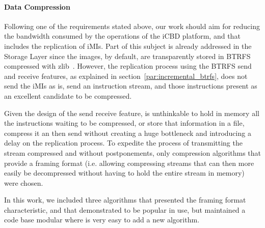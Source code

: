 \paragraph{Data Compression}
\label{par:rep_data_compression}

Following one of the requirements stated above, our work should aim for reducing the bandwidth consumed by the operations of the iCBD platform, and that includes the replication of iMIs. Part of this subject is already addressed in the Storage Layer since the images, by default, are transparently stored in BTRFS compressed with zlib~\cite{btrfs_compression}. However, the replication process using the BTRFS send and receive features, as explained in section~\ref{par:incremental_btrfs}, does not send the iMIs as is, send an instruction stream, and those instructions present as an excellent candidate to be compressed. 

Given the design of the send \/ receive feature, is unthinkable to hold in memory all the instructions waiting to be compressed, or store that information in a file, compress it an then send without creating a huge bottleneck and introducing a delay on the replication process. To expedite the process of transmitting the stream compressed and without postponements, only compression algorithms that provide a framing format (i.e. allowing compressing streams that can then more easily be decompressed without having
to hold the entire stream in memory) were chosen.

In this work, we included three algorithms that presented the framing format characteristic, and that demonstrated to be popular in use, but maintained a code base modular where is very easy to add a new algorithm.


